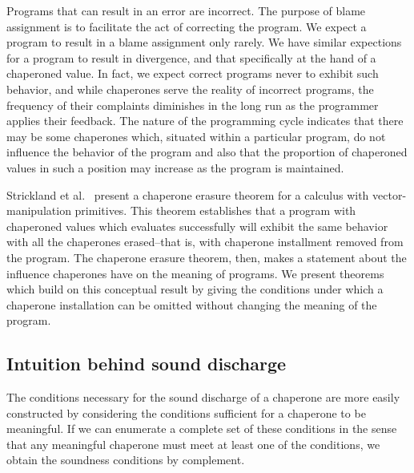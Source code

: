\documentclass{sigplanconf}
\begin{document}
Programs that can result in an error are incorrect.
The purpose of blame assignment is to facilitate the act of correcting the program.
We expect a program to result in a blame assignment only rarely.
We have similar expections for a program to result in divergence, and that specifically at the hand of a chaperoned value.
In fact, we expect correct programs never to exhibit such behavior, and while chaperones serve the reality of incorrect programs, the frequency of their complaints diminishes in the long run as the programmer applies their feedback.
The nature of the programming cycle indicates that there may be some chaperones which, situated within a particular program, do not influence the behavior of the program and also that the proportion of chaperoned values in such a position may increase as the program is maintained.

Strickland et al.~\cite{strickland2012chaperones} present a chaperone erasure theorem for a calculus with vector-manipulation primitives.
This theorem establishes that a program with chaperoned values which evaluates successfully will exhibit the same behavior with all the chaperones erased--that is, with chaperone installment removed from the program.
The chaperone erasure theorem, then, makes a statement about the influence chaperones have on the meaning of programs.
We present theorems which build on this conceptual result by giving the conditions under which a chaperone installation can be omitted without changing the meaning of the program.

\subsection{Intuition behind sound discharge}

The conditions necessary for the sound discharge of a chaperone are more easily constructed by considering the conditions sufficient for a chaperone to be meaningful.
If we can enumerate a complete set of these conditions in the sense that any meaningful chaperone must meet at least one of the conditions, we obtain the soundness conditions by complement.
\end{document}
